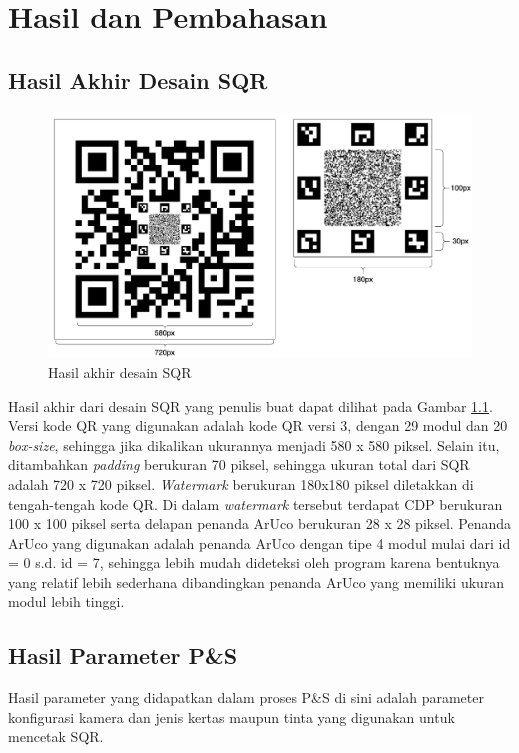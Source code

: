 \chapter{Hasil dan Pembahasan}

\section{Hasil Akhir Desain SQR}

\begin{figure}[h]
	\centering
	\includegraphics[width=12cm]{contents/chapter-4/4-modelsqrfinal.png}
	\caption{Hasil akhir desain SQR}
	\label{Fig: 4-modelsqrfinal}
\end{figure}

Hasil akhir dari desain SQR yang penulis buat dapat dilihat pada Gambar \ref{Fig: 4-modelsqrfinal}. Versi kode QR yang digunakan adalah kode QR versi 3, dengan
29 modul dan 20 \emph{box-size}, sehingga jika dikalikan ukurannya menjadi 580 x 580 piksel. Selain itu, ditambahkan \emph{padding} berukuran 70 piksel, sehingga
ukuran total dari SQR adalah 720 x 720 piksel. \emph{Watermark} berukuran 180x180 piksel diletakkan di tengah-tengah kode QR. Di dalam \emph{watermark} tersebut
terdapat CDP berukuran 100 x 100 piksel serta delapan penanda ArUco berukuran 28 x 28 piksel. Penanda ArUco yang digunakan adalah penanda ArUco dengan tipe 4 modul
mulai dari id = 0 s.d. id = 7, sehingga lebih mudah dideteksi oleh program karena bentuknya yang relatif lebih sederhana dibandingkan penanda ArUco yang
memiliki ukuran modul lebih tinggi.

\section{Hasil Parameter P\&S}
Hasil parameter yang didapatkan dalam proses P\&S di sini adalah parameter konfigurasi kamera dan jenis kertas maupun tinta yang digunakan untuk mencetak SQR.
